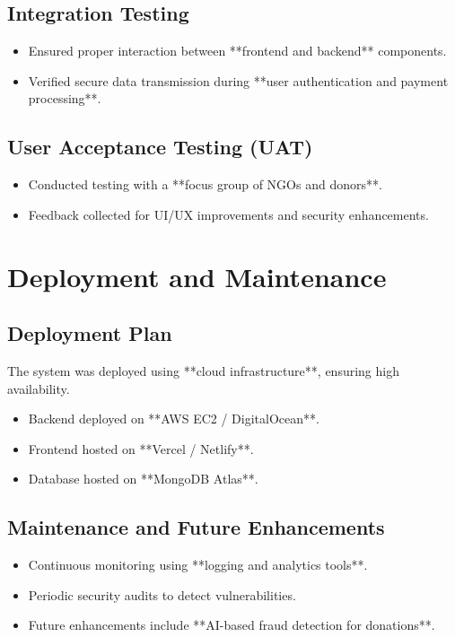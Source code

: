 \subsection{Integration Testing}
\begin{itemize}
    \item Ensured proper interaction between **frontend and backend** components.
    \item Verified secure data transmission during **user authentication and payment processing**.
\end{itemize}

\subsection{User Acceptance Testing (UAT)}
\begin{itemize}
    \item Conducted testing with a **focus group of NGOs and donors**.
    \item Feedback collected for UI/UX improvements and security enhancements.
\end{itemize}

\section{Deployment and Maintenance}
\subsection{Deployment Plan}
The system was deployed using **cloud infrastructure**, ensuring high availability.

\begin{itemize}
    \item Backend deployed on **AWS EC2 / DigitalOcean**.
    \item Frontend hosted on **Vercel / Netlify**.
    \item Database hosted on **MongoDB Atlas**.
\end{itemize}

\subsection{Maintenance and Future Enhancements}
\begin{itemize}
    \item Continuous monitoring using **logging and analytics tools**.
    \item Periodic security audits to detect vulnerabilities.
    \item Future enhancements include **AI-based fraud detection for donations**.
\end{itemize}
